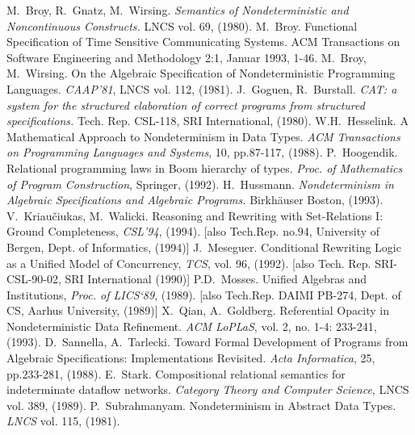 \begin{thebibliography}{BGW80} %
{}
M.~Broy, R.~Gnatz, M.~Wirsing. {\em Semantics of Nondeterministic and Noncontinuous Constructs.} LNCS vol. 69, (1980). 
M.~Broy. Functional Specification of Time Sensitive Communicating Systems. ACM Transactions on Software Engineering and Methodology 2:1, Januar 1993, 1-46.
 M.~Broy, M.~Wirsing. On the Algebraic Specification of Nondeterministic Programming Languages. {\em CAAP'81}, LNCS vol. 112, (1981). 
 J.~Goguen, R.~Burstall. {\em CAT: a system for the structured elaboration of correct programs from structured specifications.} 
Tech. Rep. CSL-118, SRI International, (1980). 
 W.H.~Hesselink. A Mathematical Approach to Nondeterminism
in Data Types. {\em ACM Transactions on Programming Languages and Systems}, 
10, pp.87-117, (1988).
 P.~Hoogendik. Relational programming laws in Boom 
hierarchy of types. {\em Proc. of Mathematics of Program Construction}, Springer, (1992).
 H.~Hussmann.
{\em Nondeterminism in Algebraic Specifications and Algebraic Programs.} Birkh\"auser Boston, (1993).
 V.~Kriau\v ciukas, M.~Walicki. Reasoning and Rewriting 
with Set-Relations I: Ground Completeness, {\em CSL'94}, (1994). [also Tech.Rep. no.94, University of Bergen, Dept. of Informatics, (1994)]  J.~Meseguer. Conditional Rewriting Logic as a 
Unified Model of Concurrency, {\em TCS}, vol. 96, (1992). [also Tech. Rep. SRI-CSL-90-02, SRI International (1990)] 
 P.D.~Mosses. Unified Algebras and Institutions, 
{\em Proc. of LICS`89}, (1989).
[also Tech.Rep. DAIMI PB-274, Dept. of CS, Aarhus University, (1989)]  X.~Qian, A.~Goldberg. Referential Opacity in 
Nondeterministic Data Refinement. {\em ACM LoPLaS}, vol. 2, no. 1-4: 233-241, (1993).
 D.~Sannella, A.~Tarlecki. 
Toward Formal Development of Programs from Algebraic Specifications: Implementations Revisited. {\em Acta Informatica}, 25, pp.233-281, (1988).
 E.~Stark. Compositional relational semantics for indeterminate dataflow networks. {\em Category Theory and Computer Science}, 
LNCS vol. 389, (1989).
 P.~Subrahmanyam. Nondeterminism in Abstract Data Types. 
{\em LNCS} vol. 115, (1981).

\end{thebibliography}
